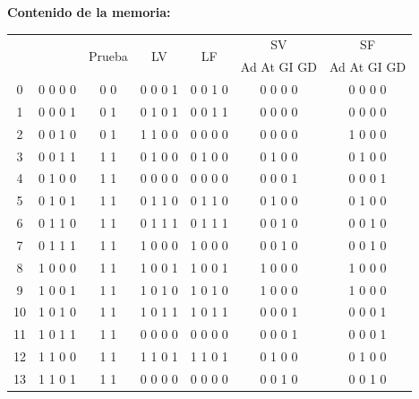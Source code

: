 \documentclass[12pt]{article}
\begin{document}
\noindent \textbf{ Contenido de la memoria:}\\
\begin{center}
	\begin{tabular}{|c|c|c|c|c|c|c|}
		\hline 
		\multicolumn{2}{|c|}{ \multirow{2}{*}{Estado}} & \multirow{2}{*}{Prueba} & \multirow{2}{*}{LV} & \multirow{2}{*}{LF} & SV & SF \\ 
		\cline{6-7}
		 \multicolumn{2}{|c|}{}& & & &Ad At GI GD & Ad At GI GD \\ 
		\hline 
		0   & 0 0 0 0 & 0 0 & 0 0 0 1 & 0 0 1 0 & 0 0 0 0 & 0 0 0 0 \\ 
		\hline                                                     
		1   & 0 0 0 1 & 0 1 & 0 1 0 1 & 0 0 1 1 & 0 0 0 0 & 0 0 0 0 \\ 
		\hline                                                     
		2   & 0 0 1 0 & 0 1 & 1 1 0 0 & 0 0 0 0 & 0 0 0 0 & 1 0 0 0 \\ 
		\hline                                                     
		3   & 0 0 1 1 & 1 1 & 0 1 0 0 & 0 1 0 0 & 0 1 0 0 & 0 1 0 0 \\ 
		\hline                                                     
		4   & 0 1 0 0 & 1 1 & 0 0 0 0 & 0 0 0 0 & 0 0 0 1 & 0 0 0 1 \\ 
		\hline                                                     
		5   & 0 1 0 1 & 1 1 & 0 1 1 0 & 0 1 1 0 & 0 1 0 0 & 0 1 0 0 \\ 
		\hline                                                     
		6   & 0 1 1 0 & 1 1 & 0 1 1 1 & 0 1 1 1 & 0 0 1 0 & 0 0 1 0 \\ 
		\hline                                                     
		7   & 0 1 1 1 & 1 1 & 1 0 0 0 & 1 0 0 0 & 0 0 1 0 & 0 0 1 0 \\ 
		\hline                                                     
		8   & 1 0 0 0 & 1 1 & 1 0 0 1 & 1 0 0 1 & 1 0 0 0 & 1 0 0 0 \\ 
		\hline                                                     
		9   & 1 0 0 1 & 1 1 & 1 0 1 0 & 1 0 1 0 & 1 0 0 0 & 1 0 0 0 \\ 
		\hline                                                     
		10  & 1 0 1 0 & 1 1 & 1 0 1 1 & 1 0 1 1 & 0 0 0 1 & 0 0 0 1 \\ 
		\hline                                                     
		11  & 1 0 1 1 & 1 1 & 0 0 0 0 & 0 0 0 0 & 0 0 0 1 & 0 0 0 1 \\ 
		\hline                                                     
		12  & 1 1 0 0 & 1 1 & 1 1 0 1 & 1 1 0 1 & 0 1 0 0 & 0 1 0 0 \\ 
		\hline                                                     
		13  & 1 1 0 1 & 1 1 & 0 0 0 0 & 0 0 0 0 & 0 0 1 0 & 0 0 1 0 \\ 
		\hline 
	\end{tabular} 
\end{center}
\end{document}
